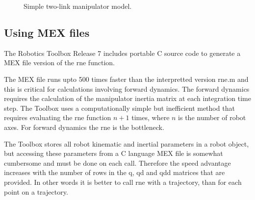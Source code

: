 \documentclass{article}
\newcommand{\var}[1]{{\vtt #1}}
\begin{document}
\begin{figure}
\caption{Simple two-link manipulator model.}\label{fig:simple-plot}
\end{figure}

\subsection{Using MEX files}\label{sec:mex}
The Robotics Toolbox Release 7 includes portable C source code to generate
a MEX file version of the \var{rne} function.

The MEX file runs upto 500
times faster than the interpretted version \var{rne.m} and this is critical
for calculations involving forward dynamics.
The forward dynamics requires the calculation of the manipulator inertia
matrix at each integration time step.  The Toolbox uses a computationally
simple but inefficient method that requires evaluating the \var{rne}
function $n+1$ times, where $n$ is the number of robot axes.  For forward
dynamics the \var{rne} is the bottleneck.

The Toolbox stores all robot kinematic and inertial parameters in a
\var{robot} object, but accessing these parameters from a C language
MEX file is somewhat cumbersome and must be done on each call.  Therefore
the speed advantage increases with the number of rows in the \var{q},
\var{qd} and \var{qdd} matrices that are provided.  In other words
it is better to call \var{rne} with a trajectory, than for each point on
a trajectory.
\end{document}
